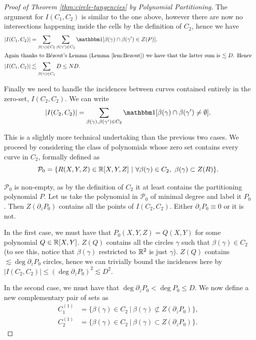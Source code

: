 \begin{proof}[Proof of Theorem \ref{thm:circle-tangencies} by Polynomial Partitioning]
The argument for $I(C_1,C_2)$ is similar to the one above, however there are now no intersections happening inside the cells by the definition of $C_2$, hence we have
\begin{align*}
    |I(C_1,C_2)| &= \sum_{\beta(\gamma)\in C_1} \sum_{\beta(\gamma') \in C_2} \OO[\beta(\gamma) \cap \beta(\gamma') \in Z(P)]. \\
    \intertext{Again thanks to Bézout's Lemma (Lemma \ref{lem:Bezout}) we have that the latter sum is $\lesssim D$. Hence}
    |I(C_1,C_2)|& \lesssim \sum_{\beta(\gamma)\in C_1} D \leq ND.
\end{align*}

Finally we need to handle the incidences between curves contained entirely in the zero-set, $I(C_2,C_2)$. We can write
\[
    |I(C_2,C_2)| = \sum_{\beta(\gamma), \beta(\gamma') \in C_2} \OO[\beta(\gamma) \cap \beta(\gamma') \neq \emptyset].
\]

This is a slightly more technical undertaking than the previous two cases.
We proceed by considering the class of polynomials whose zero set contains every curve in $C_2$, formally defined as
\[
    \mathcal P_0 = \{  R(X,Y,Z) \in \RR[X,Y,Z] \ | \ \forall \beta(\gamma) \in C_2, \ \beta(\gamma) \subset Z(R) \}.  
\]

$\mathcal P_0$ is non-empty, as by the definition of $C_2$ it at least contains the partitioning polynomial $P$. Let us take the polynomial in $\mathcal P_0$ of minimal degree and label it $P_0$. Then $Z(\partial_z P_0)$ contains all the points of $I(C_2,C_2)$.  Either $\partial_z P_0 \equiv 0$ or it is not. 

In the first case, we must have that $P_0(X,Y,Z) = Q(X,Y)$ for some polynomial $Q \in \mathbb R[X,Y]$. $Z(Q)$ contains all the circles $\gamma$ such that $\beta (\gamma) \in C_2$ (to see this, notice that $\beta(\gamma)$ restricted to $\mathbb R^2$ is just $\gamma$). $Z(Q)$ contains $\lesssim \deg \partial_z P_0$ circles, hence we can trivially bound the incidences here by $|I(C_2,C_2)| \leq (\deg \partial_z P_0 )^2 \lesssim D^2$.

In the second case, we must have that $ \deg \partial_z P_0 < \deg P_0 \leq D$. We now define a new complementary pair of sets as 
\begin{align*}
    C_1^{(1)} &= \{ \beta(\gamma) \in C_2 \ | \  \beta(\gamma) \not \subset Z(\partial_z P_0)  \}, \\
    C_2^{(1)} &=  \{ \beta(\gamma) \in C_2 \ | \  \beta(\gamma) \subset Z(\partial_z P_0)  \}.
\end{align*}


\end{proof}
